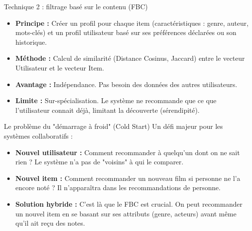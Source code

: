 \documentclass[9pt, aspectratio=169]{beamer}
\begin{document}
\begin{frame}{Technique 2 : filtrage basé sur le contenu (FBC)}
    \begin{itemize}
        \item \textbf{Principe :} Créer un profil pour chaque item (caractéristiques : genre, auteur, mots-clés) et un profil utilisateur basé sur ses préférences déclarées ou son historique.
        \item \textbf{Méthode :} Calcul de similarité (Distance Cosinus, Jaccard) entre le vecteur Utilisateur et le vecteur Item.
        \item \textbf{Avantage :} Indépendance. Pas besoin des données des autres utilisateurs.
        \item \textbf{Limite :} Sur-spécialisation. Le système ne recommande que ce que l'utilisateur connait déjà, limitant la découverte (sérendipité).
    \end{itemize}
\end{frame}

\begin{frame}{Le problème du "démarrage à froid" (Cold Start)}
    Un défi majeur pour les systèmes collaboratifs \parencite{Ko2020A} :
    \begin{itemize}
        \item \textbf{Nouvel utilisateur :} Comment recommander à quelqu'un dont on ne sait rien ? Le système n'a pas de "voisins" à qui le comparer.
        \item \textbf{Nouvel item :} Comment recommander un nouveau film si personne ne l'a encore noté ? Il n'apparaîtra dans les recommandations de personne.
        \item \textbf{Solution hybride :} C'est là que le FBC est crucial. On peut recommander un nouvel item en se basant sur ses attributs (genre, acteurs) avant même qu'il ait reçu des notes.
    \end{itemize}
\end{frame}
\end{document}
